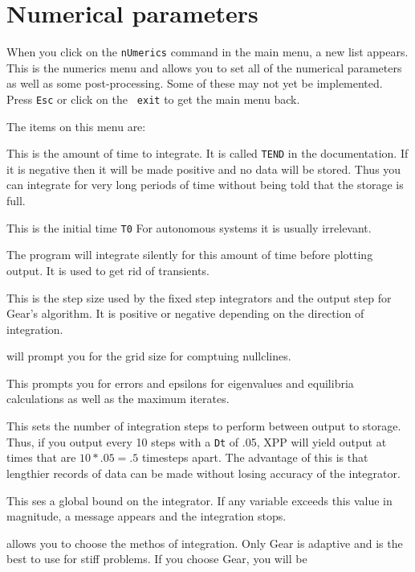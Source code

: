 \section{Numerical parameters}
When you click on the {\tt nUmerics} command in the main menu, a new
list appears.  This is the numerics menu and allows you to set all of
the numerical parameters as well as some post-processing.  Some of
these may not yet be implemented. Press {\tt Esc} or click on the {\tt
exit} to get the main menu back.

The items on this menu are:
\begin{description}
\item[(T)otal] This is the amount of time to integrate. It is called
{\tt TEND} in the documentation.  If it is
negative 
then it will be 
made positive and no data will be stored. Thus you can integrate for very long 
periods of time without being told that the storage is full.
\item[(S)tart time] This is the initial time {\tt T0} For autonomous
systems it is usually irrelevant. 
\item[tRansient] The program will integrate silently for this amount
of time before plotting output.  It is used to get rid of transients.
\item[(D)t] This is the step size used by the fixed step integrators
and the
 output step
 for Gear's algorithm.  It is positive or negative depending on the
direction of integration.    
  \item[n(C)line ctrl] will prompt you for the grid size for comptuing
nullclines. 
\item[s(I)ng pt ctrl]  This prompts you for errors and epsilons for eigenvalues 
and equilibria calculations as well as the maximum iterates.
\item[n(O)ut]  This sets the number of integration steps to perform
between output 
to
 storage.  Thus, if you output every 10 steps with a {\tt Dt} of .05, XPP will yield
 output at times that are $10*.05=.5$ timesteps apart.  The advantage of this 
is that lengthier records of data can be made without losing accuracy of the 
integrator.
\item[(B)ounds]  This ses a global bound on the integrator.  If any variable exceeds
 this value in magnitude, a message appears and the integration stops.
\item[(M)ethod]  allows you to choose the methos of integration.
Only Gear is
 adaptive
 and is the best to use for stiff problems.  If you choose Gear, you will be

\end{description}
